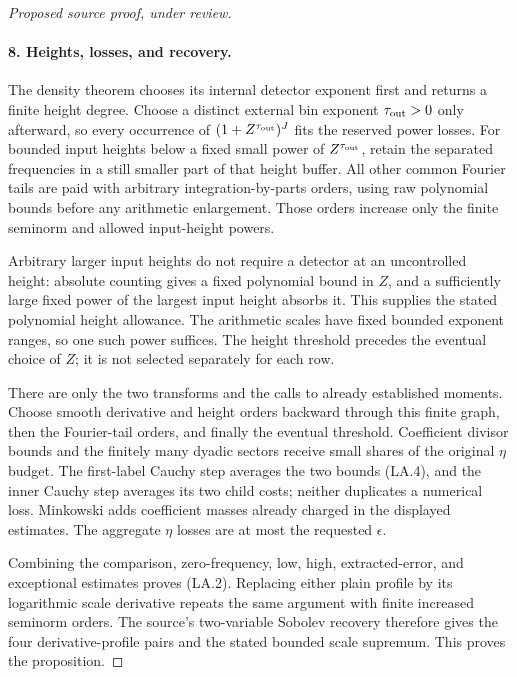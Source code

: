 \begin{proof}[Proposed source proof, under review]
\paragraph{8. Heights, losses, and recovery.}
The density theorem chooses its internal detector exponent first and
returns a finite height degree. Choose a distinct external bin exponent
$\tau_{\rm out}>0$ only afterward, so every occurrence of
$(1+Z^{\tau_{\rm out}})^J$ fits the reserved power losses. For
bounded input heights below a fixed small power of
$Z^{\tau_{\rm out}}$, retain the separated frequencies in a still
smaller part of that height buffer. All other common Fourier tails
are paid with arbitrary integration-by-parts orders, using raw
polynomial bounds before any arithmetic enlargement. Those orders
increase only the finite seminorm and allowed input-height powers.

Arbitrary larger input heights do not require a detector at an
uncontrolled height: absolute counting gives a fixed polynomial
bound in $Z$, and a sufficiently large fixed power of the largest
input height absorbs it. This supplies the stated polynomial height
allowance. The arithmetic scales have fixed bounded exponent ranges,
so one such power suffices. The height threshold precedes the
eventual choice of $Z$; it is not selected separately for each row.

There are only the two transforms and the calls to already established
moments. Choose smooth derivative and height orders backward through
this finite graph, then the Fourier-tail orders, and finally the
eventual threshold. Coefficient divisor bounds and the finitely many
dyadic sectors receive small shares of the original $\eta$ budget.
The first-label Cauchy step averages the two bounds (LA.4), and the
inner Cauchy step averages its two child costs; neither duplicates a
numerical loss. Minkowski adds coefficient masses already charged
in the displayed estimates. The aggregate $\eta$ losses are at most
the requested $\epsilon$.

Combining the comparison, zero-frequency, low, high, extracted-error,
and exceptional estimates proves (LA.2). Replacing either plain
profile by its logarithmic scale derivative repeats the same argument
with finite increased seminorm orders. The source's two-variable
Sobolev recovery therefore gives the four derivative-profile pairs
and the stated bounded scale supremum. This proves the proposition.
\end{proof}

